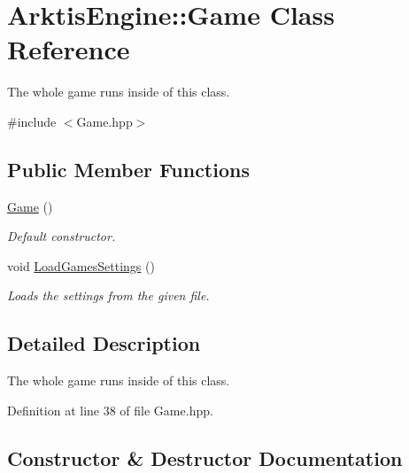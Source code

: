 \hypertarget{class_arktis_engine_1_1_game}{}\section{Arktis\+Engine\+::Game Class Reference}
\label{class_arktis_engine_1_1_game}


The whole game runs inside of this class.  




{\ttfamily \#include $<$Game.\+hpp$>$}

\subsection*{Public Member Functions}
\begin{DoxyCompactItemize}
\item 
\mbox{\hyperlink{class_arktis_engine_1_1_game_a75366b8b4dfb7715acf171cb6f47e399}{Game}} ()
\begin{DoxyCompactList}\small\item\em Default constructor. \end{DoxyCompactList}\item 
void \mbox{\hyperlink{class_arktis_engine_1_1_game_ac1b1b094168ee4b834cdf932ac4f36f5}{Load\+Games\+Settings}} ()
\begin{DoxyCompactList}\small\item\em Loads the settings from the given file. \end{DoxyCompactList}\end{DoxyCompactItemize}


\subsection{Detailed Description}
The whole game runs inside of this class. 

\begin{DoxyVerb}\end{DoxyVerb}
 

Definition at line 38 of file Game.\+hpp.



\subsection{Constructor \& Destructor Documentation}
\mbox{\label{class_arktis_engine_1_1_game_a75366b8b4dfb7715acf171cb6f47e399}} 
